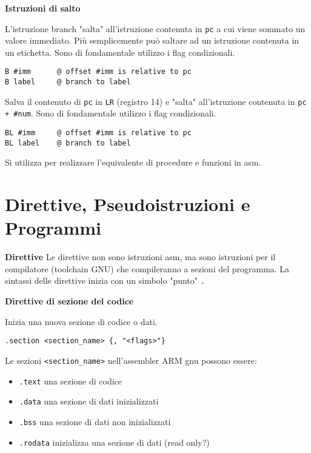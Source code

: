 \begin{defn}
\textbf{Istruzioni di salto}

L'istruzione branch "salta" all'istruzione contenuta in \verb|pc|  a cui viene sommato un valore immediato.
Più semplicemente può saltare ad un istruzione contenuta in un etichetta.
Sono di fondamentale utilizzo i flag condizionali.
\begin{lstlisting}[style=arm]
B #imm		@ offset #imm is relative to pc
B label		@ branch to label
\end{lstlisting}

Salva il contenuto di \verb|pc| in \verb|LR| (registro 14) e "salta" all'istruzione contenuta in \verb|pc + #num|. Sono di fondamentale utilizzo i flag condizionali.
\begin{lstlisting}[style=arm]
BL #imm		@ offset #imm is relative to pc
BL label	@ branch to label
\end{lstlisting}
Si utilizza per realizzare l'equivalente di procedure e funzioni in asm.
\end{defn}

\section{Direttive, Pseudoistruzioni e Programmi}

\begin{defn}
\textbf{Direttive}
Le direttive non sono istruzioni asm, ma sono istruzioni per il compilatore (toolchain GNU) che compileranno a sezioni del programma. La sintassi delle direttive inizia con un simbolo "punto" \verb|.|
\end{defn}

\begin{defn}
\textbf{Direttive di sezione del codice}

Inizia una nuova sezione di codice o dati.
\begin{lstlisting}[style=arm]
.section <section_name> {, "<flags>"}
\end{lstlisting}

Le sezioni \verb|<section_name>| nell'assembler ARM gnu possono essere:
\begin{itemize}
	\item \verb|.text| una sezione di codice
	\item \verb|.data| una sezione di dati inizializzati
	\item \verb|.bss| una sezione di dati non inizializzati
	\item \verb|.rodata| inizializza una sezione di dati (read only?)
\end{itemize}
\end{defn}

